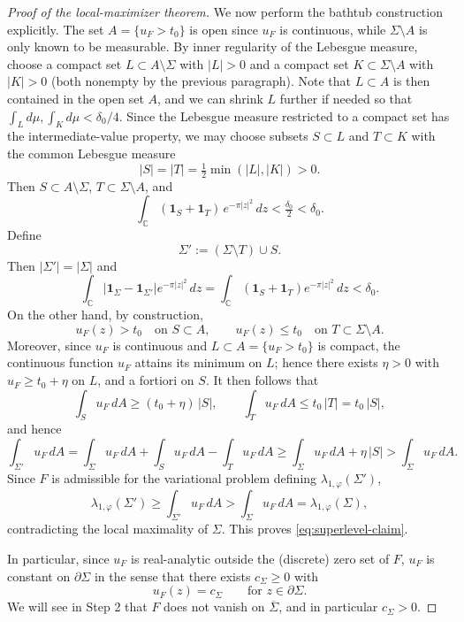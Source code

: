 \documentclass[a4paper,11pt,reqno]{amsart}
\numberwithin{equation}{section}
\theoremstyle{plain} %
\theoremstyle{definition} %
\theoremstyle{remark}
\newcommand{\C}{\mathbb{C}}
\begin{document}
\begin{proof}[Proof of the local-maximizer theorem]
We now perform the bathtub construction explicitly. The set
\(A=\{u_F>t_0\}\) is open since \(u_F\) is continuous, while
\(\Sigma\setminus A\) is only known to be measurable. By inner regularity of
the Lebesgue measure, choose a compact set \(L\subset A\setminus\Sigma\) with
\(|L|>0\) and a compact set \(K\subset \Sigma\setminus A\) with \(|K|>0\)
(both nonempty by the previous paragraph). Note that \(L\subset A\) is then
contained in the open set \(A\), and we can shrink \(L\) further if needed so
that \(\int_L d\mu, \int_K d\mu<\delta_0/4\). Since the Lebesgue measure
restricted to a compact set has the intermediate-value property, we may
choose subsets \(S\subset L\) and \(T\subset K\) with the common Lebesgue
measure
\[
|S|=|T|=\tfrac12\min(|L|,|K|)>0.
\]
Then \(S\subset A\setminus\Sigma\), \(T\subset \Sigma\setminus A\), and
\[
\int_\C (\mathbf 1_S+\mathbf 1_T)\,e^{-\pi |z|^2}\,dz<\tfrac{\delta_0}{2}<\delta_0.
\]
Define
\[
\Sigma':=(\Sigma\setminus T)\cup S.
\]
Then \(|\Sigma'|=|\Sigma|\) and
\[
\int_\C |\mathbf 1_\Sigma-\mathbf 1_{\Sigma'}|e^{-\pi |z|^2}\,dz
=\int_\C(\mathbf 1_S+\mathbf 1_T)e^{-\pi|z|^2}\,dz<\delta_0.
\]
On the other hand, by construction,
\[
u_F(z)>t_0 \quad \text{on } S\subset A,
\qquad
u_F(z)\le t_0 \quad \text{on } T\subset \Sigma\setminus A.
\]
Moreover, since \(u_F\) is continuous and \(L\subset A=\{u_F>t_0\}\) is
compact, the continuous function \(u_F\) attains its minimum on \(L\); hence
there exists \(\eta>0\) with \(u_F\ge t_0+\eta\) on \(L\), and a fortiori on
\(S\). It then follows that
\[
\int_S u_F\,dA \ge (t_0+\eta)\,|S|,
\qquad
\int_T u_F\,dA \le t_0\,|T|=t_0\,|S|,
\]
and hence
\[
\int_{\Sigma'} u_F\,dA
=
\int_\Sigma u_F\,dA + \int_S u_F\,dA-\int_T u_F\,dA
\ge \int_\Sigma u_F\,dA + \eta\,|S|
>
\int_\Sigma u_F\,dA.
\]
Since \(F\) is admissible for the variational problem defining
\(\lambda_{1,\varphi}(\Sigma')\),
\[
\lambda_{1,\varphi}(\Sigma')
\ge \int_{\Sigma'} u_F\,dA
>
\int_\Sigma u_F\,dA
=
\lambda_{1,\varphi}(\Sigma),
\]
contradicting the local maximality of \(\Sigma\). This proves
\eqref{eq:superlevel-claim}.

In particular, since \(u_F\) is real-analytic outside the (discrete) zero set of
\(F\), \(u_F\) is constant on \(\partial \Sigma\) in the sense that there exists
\(c_\Sigma\ge 0\) with
\begin{equation}\label{eq:boundary-level-set-new}
u_F(z)=c_\Sigma
\qquad \text{for } z\in \partial \Sigma.
\end{equation}
We will see in Step 2 that \(F\) does not vanish on \(\overline\Sigma\), and in
particular \(c_\Sigma>0\).


\end{proof}
\end{document}
